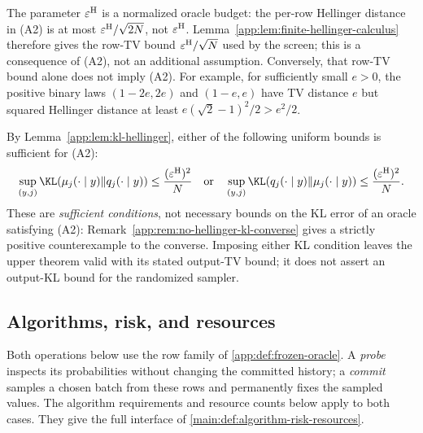 \begin{remark}
\label{app:rem:oracle-metric-calibration}
The parameter $\varepsilon^{\mathrm H}$ is a normalized oracle budget: the per-row
Hellinger distance in (A2) is at most $\varepsilon^{\mathrm H}/\sqrt{2N}$, not
$\varepsilon^{\mathrm H}$.  Lemma~\ref{app:lem:finite-hellinger-calculus} therefore
gives the row-TV bound $\varepsilon^{\mathrm H}/\sqrt N$ used by the screen; this is
a consequence of (A2), not an additional assumption.  Conversely, that
row-TV bound alone does not imply (A2).  For example, for sufficiently small
$e>0$, the positive binary laws $(1-2e,2e)$ and $(1-e,e)$ have TV distance
$e$ but squared Hellinger distance at least
$e(\sqrt2-1)^2/2>e^2/2$.

By Lemma~\ref{app:lem:kl-hellinger}, either of the following uniform bounds
is sufficient for (A2):
\begin{equation}
 \sup_{(y,j)}\KLDivergence{\ExactRow{y}{j}}{\OracleRow{y}{j}}
 \le\frac{(\OracleRadius)^2}{N}
 \quad\text{or}\quad
 \sup_{(y,j)}\KLDivergence{\OracleRow{y}{j}}{\ExactRow{y}{j}}
 \le\frac{(\OracleRadius)^2}{N}.
 \label{app:eq:row-kl-sufficient}
\end{equation}
These are \emph{sufficient conditions}, not necessary bounds on the KL error of an
oracle satisfying (A2): Remark~\ref{app:rem:no-hellinger-kl-converse} gives
a strictly positive counterexample to the converse.  Imposing either KL
condition leaves the upper theorem valid with its stated output-TV bound;
it does not assert an output-KL bound for the randomized sampler.
\end{remark}

\subsection{Algorithms, risk, and resources}
\label{app:setup-algorithms}

Both operations below use the row family of
\cref{app:def:frozen-oracle}. A \emph{probe} inspects its probabilities
without changing the committed history; a \emph{commit} samples a chosen
batch from these rows and permanently fixes the sampled values.
The algorithm requirements and resource counts below apply to both cases.
They give the full interface of \cref{main:def:algorithm-risk-resources}.


